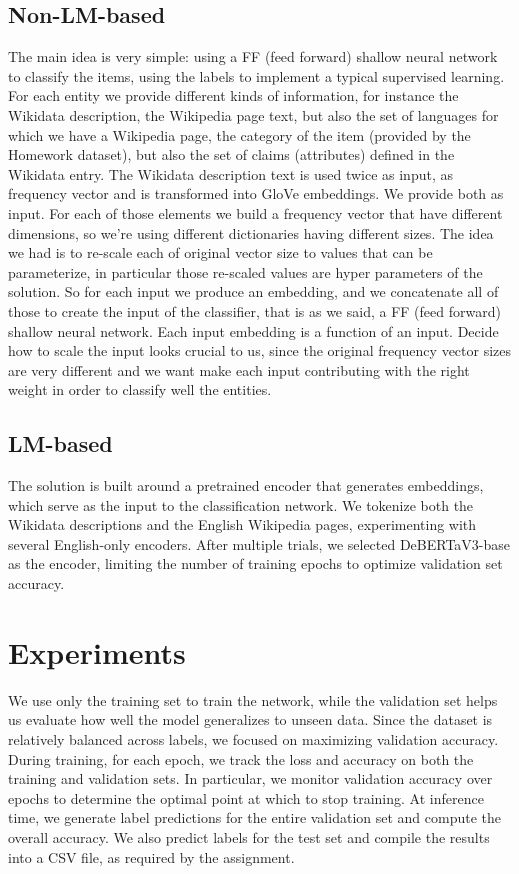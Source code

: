 \documentclass[11pt]{article}
\begin{document}
\subsection{Non-LM-based}
The main idea is very simple: using a FF (feed forward) shallow neural network to classify the items, using the labels to implement a typical supervised learning. For each entity we provide different kinds of information, for instance the Wikidata description, the Wikipedia page text, but also the set of languages for which we have a Wikipedia page, the category of the item (provided by the Homework dataset), but also the set of claims (attributes) defined in the Wikidata entry. The Wikidata description text is used twice as input, as frequency vector and is transformed into GloVe embeddings. We provide both as input.
For each of those elements we build a frequency vector that have different dimensions, so we're using different dictionaries having different sizes. The idea we had is to re-scale each of original vector size to values that can be parameterize, in particular those re-scaled values are hyper parameters of the solution. So for each input we produce an embedding, and we concatenate all of those to create the input of the classifier, that is as we said, a FF (feed forward) shallow neural network. Each input embedding is a function of an input. \newline Decide how to scale the input looks crucial to us, since the original frequency vector sizes are very different and we want make each input contributing with the right weight in order to classify well the entities. 
	
\subsection{LM-based}
The solution is built around a pretrained encoder that generates embeddings, which serve as the input to the classification network. We tokenize both the Wikidata descriptions and the English Wikipedia pages, experimenting with several English-only encoders. After multiple trials, we selected DeBERTaV3-base as the encoder, limiting the number of training epochs to optimize validation set accuracy.

\section{Experiments}
We use only the training set to train the network, while the validation set helps us evaluate how well the model generalizes to unseen data. Since the dataset is relatively balanced across labels, we focused on maximizing validation accuracy. \newline During training, for each epoch, we track the loss and accuracy on both the training and validation sets. In particular, we monitor validation accuracy over epochs to determine the optimal point at which to stop training. \newline At inference time, we generate label predictions for the entire validation set and compute the overall accuracy. We also predict labels for the test set and compile the results into a CSV file, as required by the assignment.
\end{document}
